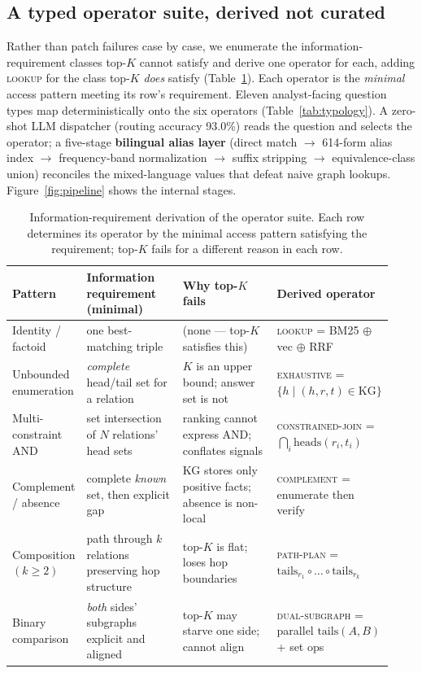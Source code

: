 \documentclass[review]{elsarticle}
\newcommand{\op}[1]{\textsc{\small #1}}
\begin{document}
\subsection{A typed operator suite, derived not curated}
Rather than patch failures case by case, we enumerate the
information-requirement classes top-$K$ cannot satisfy and derive one operator
for each, adding \op{lookup} for the class top-$K$ \emph{does} satisfy
(Table~\ref{tab:reqs}). Each operator is the \emph{minimal} access pattern
meeting its row's requirement. Eleven analyst-facing question types map
deterministically onto the six operators (Table~\ref{tab:typology}). A
zero-shot LLM dispatcher (routing accuracy 93.0\%) reads the question and
selects the operator; a five-stage \textbf{bilingual alias layer} (direct
match $\to$ 614-form alias index $\to$ frequency-band normalization $\to$
suffix stripping $\to$ equivalence-class union) reconciles the mixed-language
values that defeat naive graph lookups. Figure~\ref{fig:pipeline} shows the
internal stages.

\begin{table}[t]
\centering\small
\caption{Information-requirement derivation of the operator suite. Each row
determines its operator by the minimal access pattern satisfying the
requirement; top-$K$ fails for a different reason in each row.}
\label{tab:reqs}
\setlength{\tabcolsep}{4pt}
\begin{tabular}{p{0.18\linewidth} p{0.27\linewidth} p{0.28\linewidth} p{0.20\linewidth}}
\toprule
\textbf{Pattern} & \textbf{Information requirement (minimal)} & \textbf{Why top-$K$ fails} & \textbf{Derived operator} \\
\midrule
Identity / factoid     & one best-matching triple                                 & (none --- top-$K$ satisfies this)                                & \op{lookup} = BM25 $\oplus$ vec $\oplus$ RRF \\
Unbounded enumeration  & \emph{complete} head/tail set for a relation             & $K$ is an upper bound; answer set is not                         & \op{exhaustive} = $\{h \mid (h,r,t)\!\in\!\text{KG}\}$ \\
Multi-constraint AND   & set intersection of $N$ relations' head sets             & ranking cannot express AND; conflates signals                    & \op{constrained-join} = $\bigcap_i \text{heads}(r_i,t_i)$ \\
Complement / absence   & complete \emph{known} set, then explicit gap             & KG stores only positive facts; absence is non-local              & \op{complement} = enumerate then verify \\
Composition $(k\!\geq\!2)$ & path through $k$ relations preserving hop structure & top-$K$ is flat; loses hop boundaries                            & \op{path-plan} = $\text{tails}_{r_1}\!\circ\!\dots\!\circ\!\text{tails}_{r_k}$ \\
Binary comparison      & \emph{both} sides' subgraphs explicit and aligned        & top-$K$ may starve one side; cannot align                        & \op{dual-subgraph} = parallel $\text{tails}(A,B)$ + set ops \\
\bottomrule
\end{tabular}
\end{table}
\end{document}
